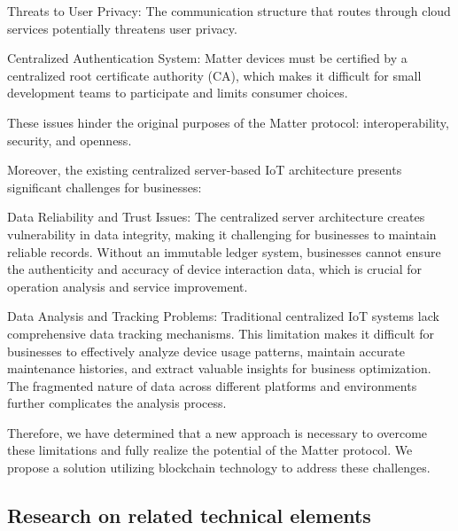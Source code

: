 \documentclass[conference]{IEEEtran}
\begin{document}
Threats to User Privacy: The communication structure that routes through cloud services potentially threatens user privacy.

Centralized Authentication System: Matter devices must be certified by a centralized root certificate authority (CA), which makes it difficult for small development teams to participate and limits consumer choices.

These issues hinder the original purposes of the Matter protocol: interoperability, security, and openness.

Moreover, the existing centralized server-based IoT architecture presents significant challenges for businesses:


Data Reliability and Trust Issues: The centralized server architecture creates vulnerability in data integrity, making it challenging for businesses to maintain reliable records. Without an immutable ledger system, businesses cannot ensure the authenticity and accuracy of device interaction data, which is crucial for operation analysis and service improvement.


Data Analysis and Tracking Problems: Traditional centralized IoT systems lack comprehensive data tracking mechanisms. This limitation makes it difficult for businesses to effectively analyze device usage patterns, maintain accurate maintenance histories, and extract valuable insights for business optimization. The fragmented nature of data across different platforms and environments further complicates the analysis process.


Therefore, we have determined that a new approach is necessary to overcome these limitations and fully realize the potential of the Matter protocol. We propose a solution utilizing blockchain technology to address these challenges.

\subsection{Research on related technical elements}
\end{document}
